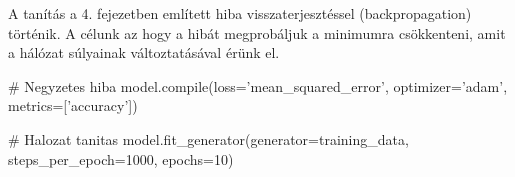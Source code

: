 A tanítás a 4. fejezetben említett hiba visszaterjesztéssel (backpropagation) történik. A célunk az hogy a hibát megprobáljuk a minimumra csökkenteni, amit a hálózat súlyainak változtatásával érünk el.

\begin{python}
# Negyzetes hiba
model.compile(loss='mean_squared_error',
              optimizer='adam',
              metrics=['accuracy'])

# Halozat tanitas
model.fit_generator(generator=training_data,
                    steps_per_epoch=1000, epochs=10)
\end{python}